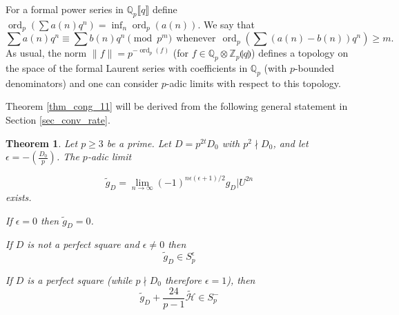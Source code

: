 \documentclass[11pt,letterpaper]{amsart}
\newcommand{\Z}{{\mathbb Z}}
\newcommand{\Q}{{\mathbb Q}}
\newcommand{\cH}{{\mathcal H}}
\DeclareMathOperator{\ord}{ord}
\newtheorem{thm}{Theorem}
\theoremstyle{remark}
\begin{document}
For a formal power series in $\Q_p \llbracket q \rrbracket$
define $\ord_p \left( \sum a(n)q^n \right) = \inf_n \ord_p(a(n))$. 
We say that 
\[
\sum a(n) q^n \equiv \sum b(n) q^n \pmod {p^m} ~~ \text{whenever} ~~ \ord_p \left( \sum \left( a(n)-b(n) \right) q^n \right) \geq m.
\]
As usual, the norm $\lVert f \rVert = p^{-\ord_p (f)}$ (for $f \in \Q_p \otimes \Z_p\llparenthesis q \rrparenthesis$)
defines a topology on the space of the formal Laurent series with coefficients in $\Q_p$ (with $p$-bounded denominators) and one can consider $p$-adic limits with respect to this topology. 

Theorem \ref{thm_cong_11} will be derived from the following general statement in Section \ref{sec_conv_rate}.

\begin{thm} \label{thm_general}
Let $p \geq 3$ be a prime. Let $D=p^{2t}D_0$ with $p^2 \nmid D_0$, and
let $\epsilon = - \left( \frac{D_0}{p} \right)$. 
The $p$-adic limit 

\[
\tilde{g}_D = \lim_{n \rightarrow \infty} (-1)^{n\epsilon(\epsilon +1)/2}g_D|U^{2n} 
\]
exists.

If $\epsilon=0$ then $\tilde{g}_D=0$. %

If $D$ is not a perfect square and $\epsilon \neq 0$ then 
\[
\tilde{g}_D \in S^\epsilon_p
\]





If $D$ is a perfect square (while $p \nmid D_0$ therefore $\epsilon=1$), then 
\[
\tilde{g}_D  + \frac{24}{p-1} \tilde{\cH} \in  S^-_p
\]
\end{thm}
\end{document}
